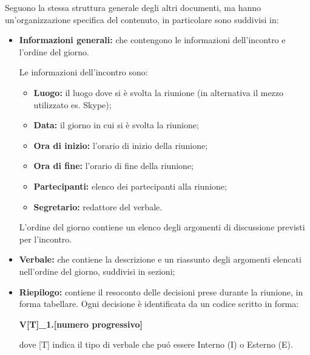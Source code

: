         Seguono la stessa struttura generale degli altri documenti, ma hanno un'organizzazione specifica del contenuto, in particolare sono suddivisi in:
        \begin{itemize}
          \item \textbf{Informazioni generali:} che contengono le informazioni dell'incontro e l'ordine del giorno.
          
             Le informazioni dell'incontro sono:
               \begin{itemize}
                 \item \textbf{Luogo:} il luogo dove si è svolta la riunione (in alternativa il mezzo utilizzato es. Skype);
                 \item \textbf{Data:} il giorno in cui si è svolta la riunione;
                 \item \textbf{Ora di inizio:} l'orario di inizio della riunione;
                 \item \textbf{Ora di fine:} l'orario di fine della riunione;
                 \item \textbf{Partecipanti:} elenco dei partecipanti alla riunione;
                 \item \textbf{Segretario:} redattore del verbale.
               \end{itemize}
			L'ordine del giorno contiene un elenco degli argomenti di discussione previsti per l'incontro.
          \item \textbf{Verbale:} che contiene la descrizione e un riassunto degli argomenti elencati nell'ordine del giorno, suddivisi in sezioni;
          \item \textbf{Riepilogo:} contiene il resoconto delle decisioni prese durante la riunione, in forma tabellare. Ogni decisione è identificata da un codice scritto in forma:
          \begin{center}
            \textbf{V[T]\_1.[numero progressivo]}
          \end{center}
          dove [T] indica il tipo di verbale che puó essere Interno (I) o Esterno (E).
        \end{itemize}

